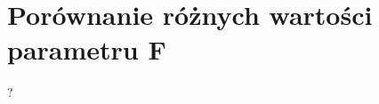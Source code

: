 \documentclass[a4paper,12pt]{article}
\theoremstyle{definition}
\begin{document}
\section{Porównanie różnych wartości parametru F}
?\\\\\\\\\\\\\\\\\\\\\\\\\\\\\\\\\\
\end{document}
